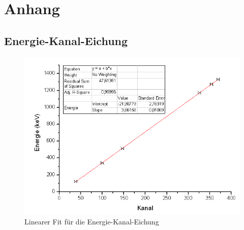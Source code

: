 \section{Anhang}

\begin{appendix}

\section{Energie-Kanal-Eichung}
\begin{figure}[H]
\centering \includegraphics[width = \textwidth]{auswertung/Eichung.png}
\caption{Linearer Fit für die Energie-Kanal-Eichung}
\end{figure}

\end{appendix}